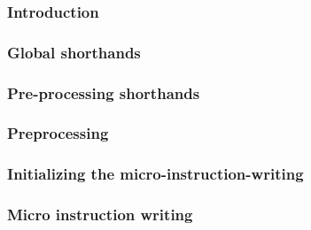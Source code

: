 \subsubsection{Introduction}                                     \label{mmu: instructions: modexp data: intro}                            
\subsubsection{Global shorthands}                                \label{mmu: instructions: modexp data: global shorthands}                
\subsubsection{Pre-processing shorthands}                        \label{mmu: instructions: modexp data: pre processing shorthands}        
\subsubsection{Preprocessing}                                    \label{mmu: instructions: modexp data: preprocessing}                    
\subsubsection{Initializing the micro-instruction-writing}       \label{mmu: instructions: modexp data: initialize}                       
\subsubsection{Micro instruction writing}                        \label{mmu: instructions: modexp data: micro instruction writing}        
